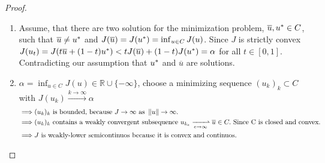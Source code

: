 \begin{theorem}
\begin{proof}
\begin{enumerate}
	\item Assume, that there are two solution for the minimization problem, $\overline{u}, {u}^{\ast} \in C$, such that $\overline{u}\neq {u}^{\ast}$ and $J(\overline{u})=J({u}^{\ast})=\inf_{u\in C} J(u)$. Since $J$ is strictly convex $J(u_t)=J(t\overline{u}+(1-t){u}^{\ast})<tJ(\overline{u})+(1-t)J({u}^{\ast}) = \alpha$ for all $t \in [0,1]$. Contradicting our assumption that ${u}^{\ast}$ and $\overline{u}$ are solutions.
	\item $\alpha = \inf_{u \in C} J(u) \in \mathbb{R}\cup\{-\infty\}$, choose a minimizing sequence $(u_k)_k\subset C$ with $J(u_k)\xrightarrow{k\rightarrow \infty} \alpha$
\begin{align*}
	\implies& (u_k)_k \mbox{ is bounded, because } J \rightarrow \infty \mbox{ as } \norm{u}\rightarrow \infty. \\
	\implies& (u_k)_k \mbox{ contains a weakly convergent subsequence } u_{k_e} \xrightharpoonup[e\rightarrow \infty]{}\overline{u}\in C. \mbox{ Since C is closed and convex.}\\
	\implies& J \mbox{ is weakly-lower semicontinuos because it is convex and continuos.}
\end{align*}

	\end{enumerate}
\end{proof}	
\end{theorem}